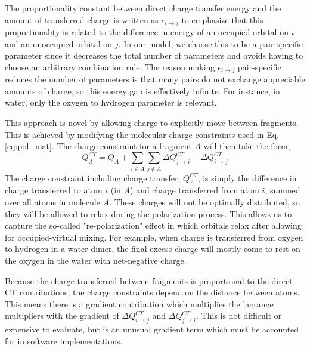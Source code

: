 \documentclass[journal=jctcce,manuscript=article]{achemso}
\begin{document}
The proportionality constant between direct charge transfer energy and the amount of transferred charge is written as $\epsilon_{i\rightarrow j}$ to emphasize that this proportionality is related to the difference in energy of an occupied orbital on $i$ and an unoccupied orbital on $j$.\cite{khaliullin2007} In our model, we choose this to be a pair-specific parameter since it decreases the total number of parameters and avoids having to choose an arbitrary combination rule. The reason making $\epsilon_{i\rightarrow j}$ pair-specific reduces the number of parameters is that many pairs do not exchange appreciable amounts of charge, so this energy gap is effectively infinite. For instance, in water, only the oxygen to hydrogen parameter is relevant.

This approach is novel by allowing charge to explicitly move between fragments. This is achieved by modifying the molecular charge constraints used in Eq. \ref{eq:pol_mat}. The charge constraint for a fragment $A$ will then take the form,
\begin{equation}
  Q^{CT}_A=Q_A+\sum_{i\in A}\sum_{j\notin A}\Delta Q^{CT}_{j\rightarrow i}-\Delta Q^{CT}_{i\rightarrow j}
  \label{eq:charge_constraint}
\end{equation}
The charge constraint including charge transfer, $Q^{CT}_A$, is simply the difference in charge transferred to atom $i$ (in $A$) and charge transferred from atom $i$, summed over all atoms in molecule $A$. These charges will not be optimally distributed, so they will be allowed to relax during the polarization process. This allows us to capture the so-called "re-polarization"\cite{khaliullin2007} effect in which orbitals relax after allowing for occupied-virtual mixing. For example, when charge is transferred from oxygen to hydrogen in a water dimer, the final excess charge will mostly come to rest on the oxygen in the water with net-negative charge.

Because the charge transferred between fragments is proportional to the direct CT contributions, the charge constraints depend on the distance between atoms. This means there is a gradient contribution which multiplies the lagrange multipliers with the gradient of $\Delta Q^{CT}_{i\rightarrow j}$ and $\Delta Q^{CT}_{j\rightarrow i}$. This is not difficult or expensive to evaluate, but is an  unusual gradient term which must be accounted for in software implementations.
\end{document}

